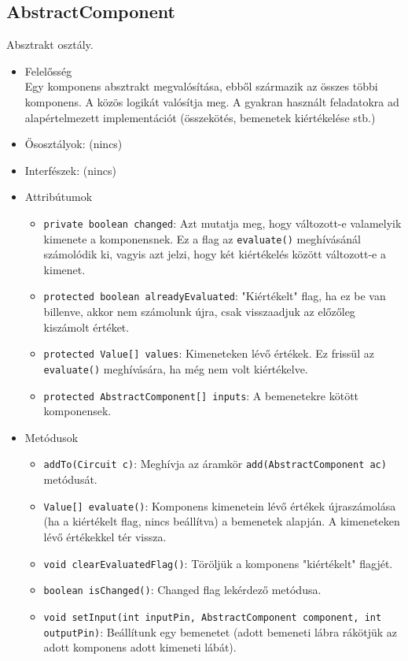 \subsection{AbstractComponent}
Absztrakt osztály.
\begin{itemize}
\item Felelősség\\
Egy komponens absztrakt megvalósítása, ebből származik az összes többi  komponens. A közös logikát valósítja meg. A gyakran használt feladatokra ad alapértelmezett implementációt (összekötés, bemenetek kiértékelése stb.)
\item Ősosztályok: (nincs)
\item Interfészek: (nincs)
\item Attribútumok $\ $
\begin{itemize}
	\item \texttt{private boolean changed}: Azt mutatja meg, hogy változott-e valamelyik kimenete a komponensnek. Ez a flag az \texttt{evaluate()} meghívásánál számolódik ki, vagyis azt jelzi, hogy két kiértékelés között változott-e a kimenet.
	\item \texttt{protected boolean alreadyEvaluated}: "Kiértékelt" flag, ha ez be van billenve, akkor nem számolunk újra, csak visszaadjuk az előzőleg kiszámolt értéket.
	\item \texttt{protected Value[] values}: Kimeneteken lévő értékek. Ez frissül az \texttt{evaluate()} meghívására, ha még nem volt kiértékelve.
	\item \texttt{protected AbstractComponent[] inputs}: A bemenetekre kötött komponensek.
\end{itemize}
\item Metódusok$\ $
\begin{itemize}
	\item \texttt{addTo(Circuit c)}: Meghívja az áramkör \texttt{add(AbstractComponent ac)} metódusát.
	\item \texttt{Value[] evaluate()}: Komponens kimenetein lévő értékek újraszámolása (ha a kiértékelt flag, nincs beállítva) a bemenetek alapján. A kimeneteken lévő értékekkel tér vissza.
	\item \texttt{void clearEvaluatedFlag()}: Töröljük a komponens "kiértékelt" flagjét.
	\item \texttt{boolean isChanged()}: Changed flag lekérdező metódusa.
	\item \raggedright \texttt{void setInput(int inputPin, AbstractComponent component, int outputPin)}: Beállítunk egy bemenetet (adott bemeneti lábra rákötjük az adott komponens adott kimeneti lábát).
\end{itemize}
\end{itemize}

